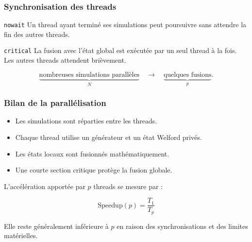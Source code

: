 \documentclass[aspectratio=169,11pt]{beamer}
\begin{document}
\begin{frame}
    \frametitle{Synchronisation des threads}

    \begin{block}{\texttt{nowait}}
        Un thread ayant terminé ses simulations peut poursuivre sans attendre
        la fin des autres threads.
    \end{block}

    \begin{block}{\texttt{critical}}
        La fusion avec l'état global est exécutée par un seul thread à la fois.
        Les autres threads attendent brièvement.
    \end{block}

    \[
        \underbrace{\text{nombreuses simulations parallèles}}_{N}
        \quad\longrightarrow\quad
        \underbrace{\text{quelques fusions}}_{p}.
    \]
\end{frame}

\begin{frame}
    \frametitle{Bilan de la parallélisation}

    \begin{itemize}
        \item Les simulations sont réparties entre les threads.
        \item Chaque thread utilise un générateur et un état Welford privés.
        \item Les états locaux sont fusionnés mathématiquement.
        \item Une courte section critique protège la fusion globale.
    \end{itemize}

    \vspace{0.4cm}

    L'accélération apportée par $p$ threads se mesure par :

    \[
        \boxed{\mathrm{Speedup}(p)=\frac{T_1}{T_p}}
    \]

    Elle reste généralement inférieure à $p$ en raison des synchronisations
    et des limites matérielles.
\end{frame}
\end{document}
